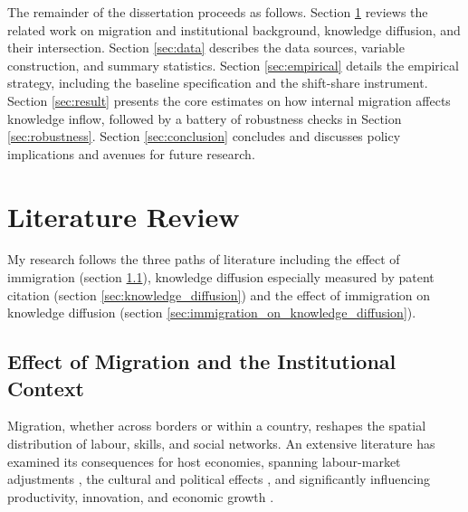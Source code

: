 \documentclass[12pt]{article}
\begin{document}
The remainder of the dissertation proceeds as follows. Section \ref{sec:literature} reviews the related work on migration and institutional background, knowledge diffusion, and their intersection. Section \ref{sec:data} describes the data sources, variable construction, and summary statistics. Section \ref{sec:empirical} details the empirical strategy, including the baseline specification and the shift-share instrument. Section \ref{sec:result} presents the core estimates on how internal migration affects knowledge inflow, followed by a battery of robustness checks in Section \ref{sec:robustness}. Section \ref{sec:conclusion} concludes and discusses policy implications and avenues for future research.

\section{Literature Review} \label{sec:literature}
My research follows the three paths of literature including the effect of immigration (section \ref{sec:effect_of_immigration}), knowledge diffusion especially measured by patent citation (section \ref{sec:knowledge_diffusion}) and the effect of immigration on knowledge diffusion (section \ref{sec:immigration_on_knowledge_diffusion}). 


\subsection{Effect of Migration and the Institutional Context} \label{sec:effect_of_immigration}

Migration, whether across borders or within a country, reshapes the spatial distribution of labour, skills, and social networks. An extensive literature has examined its consequences for host economies, spanning labour-market adjustments \citep{altonjiEffectsImmigrationLabor1991,borjasLaborDemandCurve2003,lewisImmigrationSkillMix2011,clemensImmigrationRestrictionsActive2018,dustmannFreeMovementOpen2019}, the cultural and political effects \citep{tabelliniGiftsImmigrantsWoes2019,giulianoSeedsIdeologyHistorical2020,marieImmigrationCrimeInternational2024}, and significantly influencing productivity, innovation, and economic growth \citep{bernsteinContributionHighSkilledImmigrants2022a,pratoGlobalRaceTalent2025}.
\end{document}
